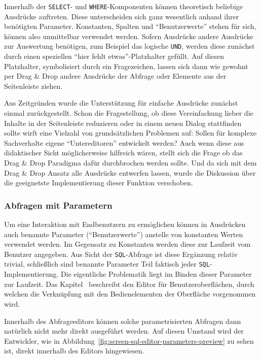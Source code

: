 Innerhalb der \texttt{SELECT}- und \texttt{WHERE}-Komponenten können theoretisch beliebige Ausdrücke auftreten. Diese unterscheiden sich ganz wesentlich anhand ihrer benötigten Parameter. Konstanten, Spalten und "`Benutzerwerte"' stehen für sich, können also unmittelbar verwendet werden. Sofern Ausdrücke andere Ausdrücke zur Auswertung benötigen, zum Beispiel das logische \texttt{UND}, werden diese zunächst durch einen speziellen "`hier fehlt etwas"'-Platzhalter gefüllt. Auf diesen Platzhalter, symbolisiert durch ein Fragezeichen, lassen sich dann wie gewohnt per Drag \& Drop andere Ausdrücke der Abfrage oder Elemente aus der Seitenleiste ziehen.

Aus Zeitgründen wurde die Unterstützung für einfache Ausdrücke zunächst einmal zurückgestellt. Schon die Fragestellung, ob diese Vereinfachung lieber die Inhalte in der Seitenleiste reduzieren oder in einem neuen Dialog stattfinden sollte wirft eine Vielzahl von grundsätzlichen Problemen auf: Sollen für komplexe Sachverhalte eigene "`Untereditoren"' entwickelt werden? Auch wenn diese aus didaktischer Sicht möglicherweise hilfreich wären, stellt sich die Frage ob das Drag \& Drop Paradigma dafür durchbrochen werden sollte. Und da sich mit dem Drag \& Drop Ansatz alle Ausdrücke entwerfen lassen, wurde die Diskussion über die geeignetste Implementierung dieser Funktion verschoben.

\subsubsection{Abfragen mit Parametern}
\label{sec:design-query-params}

Um eine Interaktion mit Endbenutzern zu ermöglichen können in Ausdrücken auch benannte Parameter ("`Benutzerwerte"') anstelle von konstanten Werten verwendet werden. Im Gegensatz zu Konstanten werden diese zur Laufzeit vom Benutzer angegeben. Aus Sicht der \texttt{SQL}-Abfrage ist diese Ergänzung relativ trivial, schließlich sind benannte Parameter Teil faktisch jeder \texttt{SQL}-Implementierung. Die eigentliche Problematik liegt im Binden dieser Parameter zur Laufzeit. Das Kapitel~ beschreibt den Editor für Benutzeroberflächen, durch welchen die Verknüpfung mit den Bedienelementen der Oberfläche vorgenommen wird.

Innerhalb des Abfrageeditors können solche parametrisierten Abfragen dann natürlich nicht mehr direkt ausgeführt werden. Auf diesen Umstand wird der Entwickler, wie in Abbildung~\ref{fig:screen-sql-editor-parameters-preview} zu sehen ist, direkt innerhalb des Editors hingewiesen.

